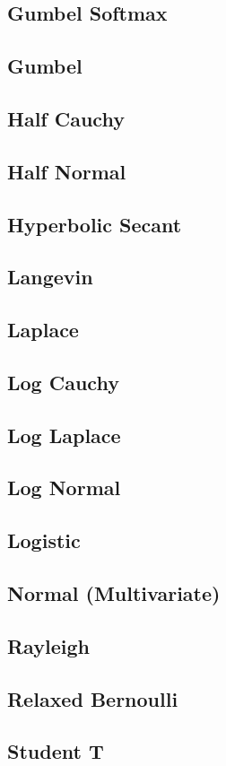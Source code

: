 \documentclass{article}
\begin{document}
\subsection{Gumbel Softmax}
\subsection{Gumbel}
\subsection{Half Cauchy}
\subsection{Half Normal}
\subsection{Hyperbolic Secant}
\subsection{Langevin}
\subsection{Laplace}
\subsection{Log Cauchy}
\subsection{Log Laplace}
\subsection{Log Normal}
\subsection{Logistic}
\subsection{Normal (Multivariate)}
\subsection{Rayleigh}
\subsection{Relaxed Bernoulli}
\subsection{Student T}
\end{document}
